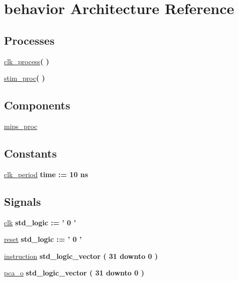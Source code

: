 \hypertarget{classmips__proc__tb_1_1behavior}{\section{behavior \-Architecture \-Reference}
\label{classmips__proc__tb_1_1behavior}
}
\*
\*
\subsection*{\-Processes}
 \begin{DoxyCompactItemize}
\item 
\hyperlink{classmips__proc__tb_1_1behavior_ac5bb218131b813f7908ec89476b31fca}{clk\-\_\-process}{\bfseries  (  )}
\item 
\hyperlink{classmips__proc__tb_1_1behavior_ad2efa6785cff833c341e27596b21aeb5}{stim\-\_\-proc}{\bfseries  (  )}
\end{DoxyCompactItemize}
\subsection*{\-Components}
 \begin{DoxyCompactItemize}
\item 
\hyperlink{classmips__proc__tb_1_1behavior_aade1eeda70a966f797de9864493345a7}{mips\-\_\-proc}  {\bfseries }  
\end{DoxyCompactItemize}
\subsection*{\-Constants}
 \begin{DoxyCompactItemize}
\item 
\hyperlink{classmips__proc__tb_1_1behavior_a5f1272460f402ee58f04009a62af525e}{clk\-\_\-period} {\bfseries time  \-:=  10  ns } 
\end{DoxyCompactItemize}
\subsection*{\-Signals}
 \begin{DoxyCompactItemize}
\item 
\hyperlink{classmips__proc__tb_1_1behavior_a6732b1e05ec0cbac56a07dc48f391fd8}{clk} {\bfseries std\-\_\-logic  \-:= '  0  ' } 
\item 
\hyperlink{classmips__proc__tb_1_1behavior_a1227312426e741edc82659864d673dd7}{reset} {\bfseries std\-\_\-logic  \-:= '  0  ' } 
\item 
\hyperlink{classmips__proc__tb_1_1behavior_a46c7e46ecf9add8594bee7c639ee1fe1}{instruction} {\bfseries std\-\_\-logic\-\_\-vector (   31    downto    0  ) } 
\item 
\hyperlink{classmips__proc__tb_1_1behavior_a9ab65ec266e93aca6fc7f8ce688f92bf}{pca\-\_\-o} {\bfseries std\-\_\-logic\-\_\-vector (   31    downto    0  ) } 
\end{DoxyCompactItemize}


